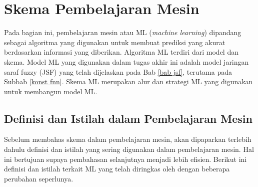 \vspace{15cm}
\chapter{Skema Pembelajaran Mesin} \label{bab skema}
\noindent Pada bagian ini, pembelajaran mesin atau ML (\emph{machine learning}) dipandang sebagai algoritma yang digunakan untuk membuat prediksi yang akurat berdasarkan informasi yang diberikan. Algoritma ML terdiri dari model dan skema. Model ML yang digunakan dalam tugas akhir ini adalah model jaringan saraf fuzzy (JSF) yang telah dijelaskan pada Bab \ref{bab jsf}, terutama pada Subbab \ref{konst fnn}. Skema ML merupakan alur dan strategi ML yang digunakan untuk membangun model ML.

\section{Definisi dan Istilah dalam Pembelajaran Mesin} \label{istilah ML}
\noindent Sebelum membahas skema dalam pembelajaran mesin, akan dipaparkan terlebih dahulu definisi dan istilah yang sering digunakan dalam pembelajaran mesin. Hal ini bertujuan supaya pembahasan selanjutnya menjadi lebih efisien. Berikut ini definisi dan istilah terkait ML yang telah diringkas oleh  dengan beberapa perubahan seperlunya.
